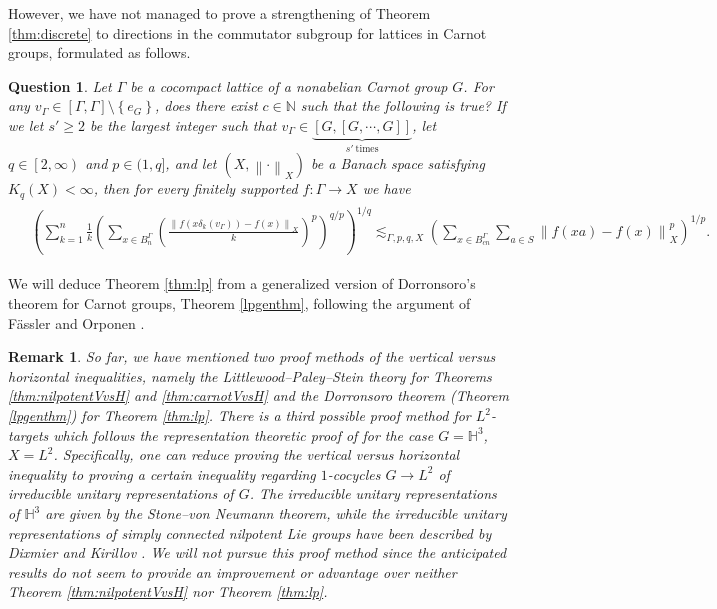 \documentclass[11pt,reqno]{amsart}
\newtheorem{remark}[theorem]{Remark}
\newtheorem{question}[theorem]{Question}
\newcommand{\1}{\mathbf 1}
\begin{document}
However, we have not managed to prove a strengthening of Theorem \ref{thm:discrete} to directions in the commutator subgroup for lattices in Carnot groups, formulated as follows.
\begin{question}\label{ques:discrete-Carnot}
Let $\Gamma$ be a cocompact lattice of a nonabelian Carnot group $G$. For any $v_\Gamma\in \left[\Gamma,\Gamma\right]\setminus\left\{e_G\right\}$, does there exist $c\in \mathbb{N}$ such that the following is true? If we let $s'\ge 2$ be the largest integer such that $v_\Gamma\in \underbrace{\left[G,\left[G,\cdots,G\right]\right]}_{s'\mathrm{~times}}$, let $q\in \left[2,\infty\right)$ and $p\in (1,q]$, and let $\left(X,\left\|\cdot\right\|_X\right)$ be a Banach space satisfying $K_q\left(X\right)<\infty$, then for every finitely supported $f:\Gamma\to X$ we have
\begin{align*}
\begin{aligned}
&\left(\sum_{k=1}^{n}\frac{1}{k}\left(\sum_{x\in B^\Gamma_n} \left(\frac{\left\|f\left(x\delta_k\left(v_\Gamma\right)\right)-f\left(x\right)\right\|_X}{k}\right)^p\right)^{q/p}\right)^{1/q}\lesssim_{\Gamma,p,q,X}
\left(\sum_{x\in B^\Gamma_{cn}} \sum_{a\in S}\left\|f\left(xa\right)-f\left(x\right)\right\|^p_X\right)^{1/p}.
\end{aligned}
\end{align*}
\end{question}

We will deduce Theorem \ref{thm:lp} from a generalized version of Dorronsoro's theorem \cite{dorronsoro1985characterization} for Carnot groups, Theorem \ref{lpgenthm}, following the argument of F\"assler and Orponen \cite{fassler2020dorronsoro}.


\begin{remark}
So far, we have mentioned two proof methods of the vertical versus horizontal inequalities, namely the Littlewood--Paley--Stein theory for Theorems \ref{thm:nilpotentVvsH} and \ref{thm:carnotVvsH} and the Dorronsoro theorem (Theorem \ref{lpgenthm}) for Theorem \ref{thm:lp}. There is a third possible proof method for $L^2$-targets which follows the representation theoretic proof of \cite{austin2013sharp} for the case $G=\mathbb{H}^3$, $X=L^2$. Specifically, one can reduce proving the vertical versus horizontal inequality to proving a certain inequality regarding $1$-cocycles $G\to L^2$ of irreducible unitary representations of $G$. The irreducible unitary representations of $\mathbb{H}^3$ are given by the Stone--von Neumann theorem, while the irreducible unitary representations of simply connected nilpotent Lie groups have been described by Dixmier \cite{dixmier1959representations,dixmier1957representations} and Kirillov \cite{kirillov1962unitary}. We will not pursue this proof method since the anticipated results do not seem to provide an improvement or advantage over neither Theorem \ref{thm:nilpotentVvsH} nor Theorem \ref{thm:lp}.
\end{remark}
\end{document}
